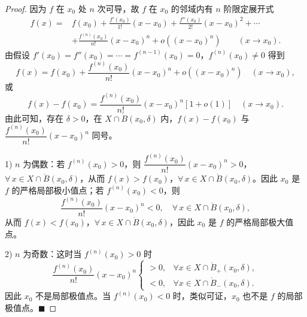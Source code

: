 \begin{proof}

因为 $f$ 在 $x_0$ 处 $n$ 次可导，故 $f$ 在 $x_0$ 的邻域内有 $n$ 阶限定展开式
\[\begin{aligned}
f(x)={}&f(x_0)+\frac{f'(x_0)}{1!}(x-x_0)+\frac{f''(x_0)}{2!}(x-x_0)^2+\cdots\\
&+\frac{f^{(n)}(x_0)}{n!}(x-x_0)^n+o((x-x_0)^n)\qquad(x\to x_0).
\end{aligned}\]
由假设 $f'(x_0)=f''(x_0)=\cdots=f^{(n-1)}(x_0)=0$，$f^{(n)}(x_0)\neq0$ 得到
\[f(x)=f(x_0)+\frac{f^{(n)}(x_0)}{n!}(x-x_0)^n+o((x-x_0)^n)\quad(x\to x_0),\]
或
\[f(x)-f(x_0)=\frac{f^{(n)}(x_0)}{n!}(x-x_0)^n[1+o(1)]\quad(x\to x_0).\]
由此可知，存在 $\delta>0$，在 $X\cap\mathring{B}(x_0,\delta)$ 内，$f(x)-f(x_0)$ 与 $\dfrac{f^{(n)}(x_0)}{n!}(x-x_0)^n$ 同号。

1) $n$ 为偶数：若 $f^{(n)}(x_0)>0$，则 $\dfrac{f^{(n)}(x_0)}{n!}(x-x_0)^n>0$，$\forall\,x\in X\cap\mathring{B}(x_0,\delta)$，从而 $f(x)>f(x_0)$，$\forall\,x\in X\cap\mathring{B}(x_0,\delta)$。因此 $x_0$ 是 $f$ 的严格局部极小值点；若 $f^{(n)}(x_0)<0$，则
\[\frac{f^{(n)}(x_0)}{n!}(x-x_0)^n<0,\quad\forall\,x\in X\cap\mathring{B}(x_0,\delta),\]
从而 $f(x)<f(x_0)$，$\forall\,x\in X\cap\mathring{B}(x_0,\delta)$，因此 $x_0$ 是 $f$ 的严格局部极大值点。

2) $n$ 为奇数：这时当 $f^{(n)}(x_0)>0$ 时
\[\frac{f^{(n)}(x_0)}{n!}(x-x_0)^n\begin{cases} >0, & \forall x\in X\cap\mathring{B}_+(x_0,\delta),\\ <0, & \forall x\in X\cap\mathring{B}_-(x_0,\delta). \end{cases}\]
因此 $x_0$ 不是局部极值点。当 $f^{(n)}(x_0)<0$ 时，类似可证，$x_0$ 也不是 $f$ 的局部极值点。$\blacksquare$

\end{proof}

